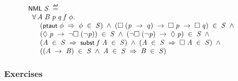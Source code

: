 \documentclass{report}
\renewcommand{\HOLConst}[1]{{\textsf{\upshape\small #1}}}
\newenvironment{holmath}{\begin{displaymath}\begin{array}{l}}{\end{array}\end{displaymath}\ignorespacesafterend}
\begin{document}
\begin{holmath}
  \HOLConst{NML}\;\HOLFreeVar{S}\;\HOLSymConst{\HOLTokenDefEquality{}}\\
\;\;\HOLSymConst{\HOLTokenForall{}}\HOLBoundVar{A}\;\HOLBoundVar{B}\;\HOLBoundVar{p}\;\HOLBoundVar{q}\;\HOLBoundVar{f}\;\HOLBoundVar{\ensuremath{\phi}}.\\
\;\;\;\;\;\;(\HOLConst{ptaut}\;\HOLBoundVar{\ensuremath{\phi}}\;\HOLSymConst{\HOLTokenImp{}}\;\HOLBoundVar{\ensuremath{\phi}}\;\HOLSymConst{\HOLTokenIn{}}\;\HOLFreeVar{S})\;\HOLSymConst{\HOLTokenConj{}}\;(\HOLSymConst{\ensuremath{\Box}}\;(\HOLBoundVar{p}\;\HOLSymConst{\ensuremath{\rightarrow}}\;\HOLBoundVar{q})\;\HOLSymConst{\ensuremath{\rightarrow}}\;\HOLSymConst{\ensuremath{\Box}}\;\HOLBoundVar{p}\;\HOLSymConst{\ensuremath{\rightarrow}}\;\HOLSymConst{\ensuremath{\Box}}\;\HOLBoundVar{q})\;\HOLSymConst{\HOLTokenIn{}}\;\HOLFreeVar{S}\;\HOLSymConst{\HOLTokenConj{}}\\
\;\;\;\;\;\;(\HOLSymConst{\ensuremath{\Diamond}}\;\HOLBoundVar{p}\;\HOLSymConst{\ensuremath{\rightarrow}}\;\HOLSymConst{\HOLTokenNeg{}}\HOLSymConst{\ensuremath{\Box}}\;(\HOLSymConst{\HOLTokenNeg{}}\HOLBoundVar{p}))\;\HOLSymConst{\HOLTokenIn{}}\;\HOLFreeVar{S}\;\HOLSymConst{\HOLTokenConj{}}\;(\HOLSymConst{\HOLTokenNeg{}}\HOLSymConst{\ensuremath{\Box}}\;(\HOLSymConst{\HOLTokenNeg{}}\HOLBoundVar{p})\;\HOLSymConst{\ensuremath{\rightarrow}}\;\HOLSymConst{\ensuremath{\Diamond}}\;\HOLBoundVar{p})\;\HOLSymConst{\HOLTokenIn{}}\;\HOLFreeVar{S}\;\HOLSymConst{\HOLTokenConj{}}\\
\;\;\;\;\;\;(\HOLBoundVar{A}\;\HOLSymConst{\HOLTokenIn{}}\;\HOLFreeVar{S}\;\HOLSymConst{\HOLTokenImp{}}\;\HOLConst{subst}\;\HOLBoundVar{f}\;\HOLBoundVar{A}\;\HOLSymConst{\HOLTokenIn{}}\;\HOLFreeVar{S})\;\HOLSymConst{\HOLTokenConj{}}\;(\HOLBoundVar{A}\;\HOLSymConst{\HOLTokenIn{}}\;\HOLFreeVar{S}\;\HOLSymConst{\HOLTokenImp{}}\;\HOLSymConst{\ensuremath{\Box}}\;\HOLBoundVar{A}\;\HOLSymConst{\HOLTokenIn{}}\;\HOLFreeVar{S})\;\HOLSymConst{\HOLTokenConj{}}\\
\;\;\;\;\;\;((\HOLBoundVar{A}\;\HOLSymConst{\ensuremath{\rightarrow}}\;\HOLBoundVar{B})\;\HOLSymConst{\HOLTokenIn{}}\;\HOLFreeVar{S}\;\HOLSymConst{\HOLTokenConj{}}\;\HOLBoundVar{A}\;\HOLSymConst{\HOLTokenIn{}}\;\HOLFreeVar{S}\;\HOLSymConst{\HOLTokenImp{}}\;\HOLBoundVar{B}\;\HOLSymConst{\HOLTokenIn{}}\;\HOLFreeVar{S})
\end{holmath}

\subsubsection{Exercises}
\end{document}
